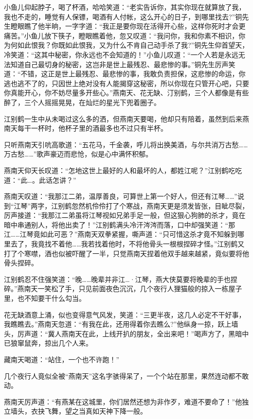 \documentclass[12pt,oneside]{book}
\begin{document}
小鱼儿仰起脖子，喝了杯酒，哈哈笑道：``老实告诉你，其实你现在就算放了我，我也不走的，睡觉有人保镖，喝酒有人付帐，这么开心的日子，到哪里找去?''铜先生瞪眼瞧了他半晌，一字字道：``我正是要你现在活得开心些，这样你死时才会更痛苦。''小鱼儿放下筷子，瞪眼瞧着他，忽又叹道：``我问你，我和你素不相识，你为何如此恨我？你既如此恨我，又为什么不肯自己动手杀了我?''铜先生仰首望天，冷笑道：``这其中秘密，你永远也不会知道的！''小鱼儿叹道：``一个人若是永远无法知道自己最切身的秘密，这岂非是世上最残忍、最悲惨的事。''铜先生厉声笑道：``不错，这正是世上最残忍、最悲惨的事，我敢负责担保，这悲惨的命运，你逃也逃不了的，只因世上绝对没有人能揭穿这秘密，所以你现在只管开心吧，只要你真能开心，你不妨尽量多开些心。''燕南天、花无缺、汀别鹤，三个人都像是有些醉了，三个人摇摇晃晃，在灿烂的星光下兜着圈子。

江别鹤一生中从未喝过这么多的洒，但燕南天要喝，他却只有陪着，虽然到后来燕南天每干一杯时，他杯子里的酒最多也不过只有半杯。

只听燕南天引吭高歌道：``五花马，千金袭，呼儿将出换美酒，与尔共消万古愁\ldots\ldots 万古愁\ldots\ldots{}''歌声豪迈而悲怆，似是心中满怀积郁。

燕南天仰天长叹道：``怎地这世上最好的人和最坏的人，都姓江呢？''江别鹤吃吃道：``此\ldots。此话怎讲？''

燕南天叹道：``我那江二弟，温厚善良，可算世上第一个好人，但还有江琴\ldots\ldots{}''说到``江琴''两字，江别鹤忽然机伶伶打了个寒战，燕南天更是须发皆张，目眦尽裂，厉声接道：``我那江二弟虽将江琴视如兄弟手足一般，但这狠心狗肺的杀才，竟在暗中串通别人，将他出卖了！''江别鹤满头冷汗涔涔而落，口中却强笑道：``那江\ldots\ldots 江琴竟如此可恶？''燕南天双拳紧握，嘶声道：``只可惜这杀才竟不知躲到哪里去了，我竟找不着他\ldots\ldots 我若找着他时，不将他骨头一根根捏碎才怪。''江别鹤又打了个寒噤，酒也似被吓醒了一半，只觉燕南天捏着他双手越来越紧，竟似要将他骨头捏碎。

江别鹤忍不住强笑道：``晚\ldots\ldots 晚辈并非江\ldots·江琴，燕大侠莫要将晚辈的手也捏碎。''燕南天一笑松了手，只见前面夜色沉沉，几个夜行人狸猫般的掠入一栋屋子里，也不知要干什么勾当。

花无缺酒意上涌，似也变得意气风发，笑道：``三更半夜，这几人必定不干好事，我瞧瞧去。''燕南天忽道：``有我在此，还用得着你去瞧么?''他纵身一掠，跃上墙头，厉声道：``冀人燕南天在此，上线开扒的朋友，全出来吧！''喝声方了，黑暗中已狼窜鼠奔，掠出几个人来。

藏南天喝道：``站住，一个也不许跑！''

几个夜行人竟似全被``燕南天''这名字骇得呆了，一个个站在那里，果然连动都不敢动。

燕南天厉声道：``有燕某在这城里，你们居然还想为非作歹，难道不要命了！''他独立墙头，衣抉飞舞，望之当真如天神下降一般。
\end{document}
